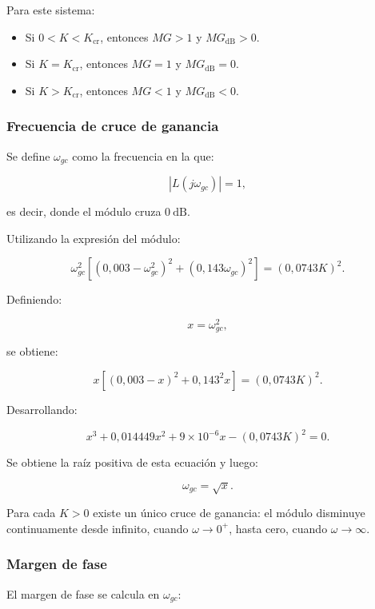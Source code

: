 \documentclass[12pt,a4paper]{article}
\begin{document}
Para este sistema:

\begin{itemize}

    \item Si $0<K<K_{\mathrm{cr}}$, entonces
    $MG>1$ y $MG_{\mathrm{dB}}>0$.

    \item Si $K=K_{\mathrm{cr}}$, entonces
    $MG=1$ y $MG_{\mathrm{dB}}=0$.

    \item Si $K>K_{\mathrm{cr}}$, entonces
    $MG<1$ y $MG_{\mathrm{dB}}<0$.

\end{itemize}


\subsubsection*{Frecuencia de cruce de ganancia}

Se define $\omega_{gc}$ como la frecuencia en la que:

\[
|L(j\omega_{gc})|=1,
\]

es decir, donde el módulo cruza $0\ \mathrm{dB}$.

Utilizando la expresión del módulo:

\[
\omega_{gc}^2
\left[
(0{,}003-\omega_{gc}^2)^2
+
(0{,}143\omega_{gc})^2
\right]
=
(0{,}0743K)^2.
\]

Definiendo:

\[
x=\omega_{gc}^2,
\]

se obtiene:

\[
x
\left[
(0{,}003-x)^2
+
0{,}143^2x
\right]
=
(0{,}0743K)^2.
\]

Desarrollando:

\[
\boxed{
x^3
+
0{,}014449x^2
+
9\times10^{-6}x
-
(0{,}0743K)^2
=
0.
}
\]

Se obtiene la raíz positiva de esta ecuación y luego:

\[
\boxed{
\omega_{gc}
=
\sqrt{x}.
}
\]

Para cada $K>0$ existe un único cruce de ganancia:
el módulo disminuye continuamente desde infinito,
cuando $\omega\to0^+$, hasta cero, cuando
$\omega\to\infty$.


\subsubsection*{Margen de fase}

El margen de fase se calcula en $\omega_{gc}$:
\end{document}
